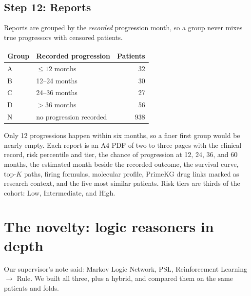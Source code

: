 \documentclass[11pt,a4paper]{article}
\begin{document}
\subsection{Step 12: Reports}
Reports are grouped by the \emph{recorded} progression month, so a group never mixes true progressors with censored patients.
\begin{center}
\begin{tabular}{llr}
\toprule
Group & Recorded progression & Patients \\
\midrule
A & $\le 12$ months & 32 \\
B & 12--24 months & 30 \\
C & 24--36 months & 27 \\
D & $>36$ months & 56 \\
N & no progression recorded & 938 \\
\bottomrule
\end{tabular}
\end{center}
Only 12 progressions happen within six months, so a finer first group would be nearly empty. Each report is an A4 PDF of two to three pages with the clinical record, risk percentile and tier, the chance of progression at 12, 24, 36, and 60 months, the estimated month beside the recorded outcome, the survival curve, top-$K$ paths, firing formulas, molecular profile, PrimeKG drug links marked as research context, and the five most similar patients. Risk tiers are thirds of the cohort: Low, Intermediate, and High.

\section{The novelty: logic reasoners in depth}\label{sec:logic}
Our supervisor's note said: Markov Logic Network, PSL, Reinforcement Learning $\to$ Rule. We built all three, plus a hybrid, and compared them on the same patients and folds.
\end{document}
